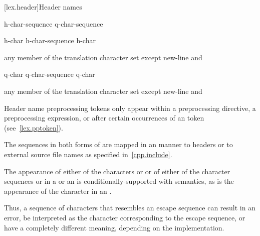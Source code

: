 [lex.header]{Header names}

%
\begin{bnf}
\obeyspaces
{}\br
    \terminal{<} h-char-sequence \terminal{>}\br
     q-char-sequence 
\end{bnf}

\begin{bnf}
\br
    h-char\br
    h-char-sequence h-char
\end{bnf}

\begin{bnf}
\br
    \textnormal{any member of the translation character set except new-line and }
\end{bnf}

\begin{bnf}
\br
    q-char\br
    q-char-sequence q-char
\end{bnf}

\begin{bnf}
\br
    \textnormal{any member of the translation character set except new-line and }
\end{bnf}

\pnum
\begin{note}
Header name preprocessing tokens only appear within
a  preprocessing directive,
a  preprocessing expression, or
after certain occurrences of an  token
(see~\ref{lex.pptoken}).
\end{note}
The sequences in both forms of  are mapped in an
 manner to headers or to
external source file names as specified in~\ref{cpp.include}.

\pnum
The appearance of either of the characters  or \tcode{\textbackslash} or of
either of the character sequences \tcode{/*} or \tcode{//} in a
 or an 
is conditionally-supported with  semantics, as is the appearance of the character
 in an .
\begin{footnote}
Thus, a sequence of characters
that resembles an escape sequence can result in an error, be interpreted as the
character corresponding to the escape sequence, or have a completely different meaning,
depending on the implementation.
\end{footnote}

